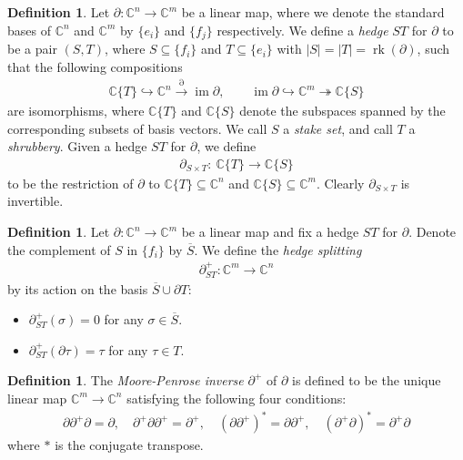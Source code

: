 \documentclass[11pt,reqno]{amsart}
\def\im {{\operatorname{im}}}
\def\rk {{\operatorname{rk}}}
\def\C {{\mathbb C}}
\theoremstyle{definition}
\newtheorem{definition}[theorem]{Definition}
\numberwithin{equation}{section}
\begin{document}
\begin{definition}
    Let $\partial:\C^n\rightarrow\C^m$ be a linear map, where we denote the standard bases of $\C^n$ and $\C^m$ by $\{e_i\}$ and $\{f_j\}$ respectively. We define a \textit{hedge} $ST$ for $\partial$ to be a pair $(S,T)$, where $S\subseteq\{f_i\}$ and $T\subseteq\{e_i\}$ with $|S| = |T| = \rk(\partial)$, such that the following compositions
\begin{align*}
    \C\{T\} \hookrightarrow \C^n \xrightarrow{\partial} \im\partial,\qquad \im\partial\hookrightarrow \C^m \twoheadrightarrow \C\{S\}
\end{align*}
are isomorphisms, where $\C\{T\}$ and $\C\{S\}$ denote the subspaces spanned by the corresponding subsets of basis vectors. We call $S$ a \textit{stake set}, and call $T$ a \textit{shrubbery}. Given a hedge $ST$ for $\partial$, we define
\begin{align*}
    \partial_{S\times T}:\ \C\{T\} \rightarrow \C\{S\}
\end{align*}
to be the restriction of $\partial$ to $\C\{T\}\subseteq \C^n$ and $\C\{S\}\subseteq \C^m$. Clearly $\partial_{S\times T}$ is invertible.
\end{definition}

\smallskip


\begin{definition}
    Let $\partial:\C^n\rightarrow\C^m$ be a linear map and fix a hedge $ST$ for $\partial$. Denote the complement of $S$ in $\{f_i\}$ by $\overline{S}$. We define the \textit{hedge splitting} 
    \begin{align*}
        \partial_{ST}^+: \C^m\rightarrow\C^n
    \end{align*} 
    by its action on the basis $\overline{S}\cup\partial T$:
    \begin{itemize}
        \item $\partial_{ST}^+(\sigma) = 0$ for any $\sigma\in\overline{S}$.
        \item $\partial_{ST}^+(\partial \tau) = \tau$ for any $\tau\in T$.
    \end{itemize}
\end{definition}


\smallskip


\begin{definition}
    The \textit{Moore-Penrose inverse} $\partial^+$ of $\partial$ is defined to be the unique linear map $\C^m\rightarrow\C^n$ satisfying the following four conditions:
    \begin{align*}
        \partial\partial^+\partial = \partial,\quad \partial^+\partial\partial^+ = \partial^+,\quad (\partial\partial^+)^* = \partial\partial^+,\quad (\partial^+\partial)^* = \partial^+\partial
    \end{align*}
    where $*$ is the conjugate transpose.
\end{definition}
\end{document}
